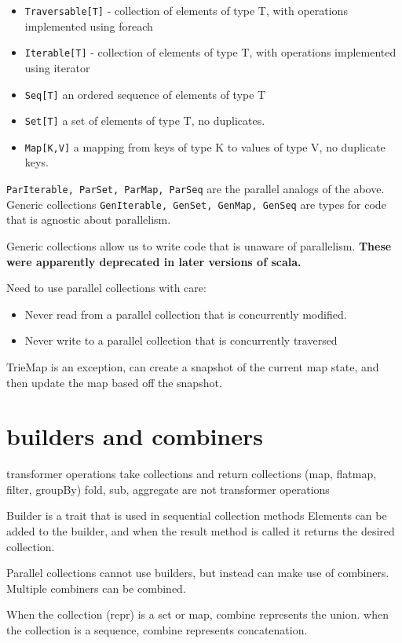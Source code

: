 \begin{itemize}
    \item \lstinline|Traversable[T]| - collection of elements of type T, with operations implemented using foreach
    \item \lstinline|Iterable[T]| - collection of elements of type T, with operations implemented using iterator
    \item \lstinline|Seq[T]| an ordered sequence of elements of type T
    \item \lstinline|Set[T]| a set of elements of type T, no duplicates.
    \item \lstinline|Map[K,V]| a mapping from keys of type K to values of type V, no duplicate keys.
\end{itemize}

\lstinline|ParIterable, ParSet, ParMap, ParSeq| are the parallel analogs of the above.
Generic collections \lstinline|GenIterable, GenSet, GenMap, GenSeq| are types for code that is agnostic about parallelism.

Generic collections allow us to write code that is unaware of parallelism. {\bf These were apparently deprecated in later versions of scala.}

Need to use parallel collections with care:
\begin{itemize}
    \item Never read from a parallel collection that is concurrently modified.
    \item Never write to a parallel collection that is concurrently traversed
\end{itemize}
TrieMap is an exception, can create a snapshot of the current map state, and then update the map based off the snapshot.

\section{ builders and combiners}
transformer operations take collections and return collections (map, flatmap, filter, groupBy)
fold, sub, aggregate are not transformer operations

Builder is a trait that is used in sequential collection methods
Elements can be added to the builder, and when the result method is called it returns the desired collection.

Parallel collections cannot use builders, but instead can make use of combiners. Multiple combiners can be combined.

When the collection (repr) is a set or map, combine represents the union.
when the collection is a sequence, combine represents concatenation.

